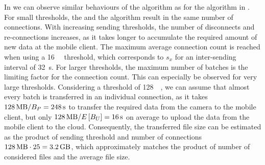 In  we can observe similar behaviours of the \algosize algorithm as for the \algointerval algorithm in .
For small thresholds, the \algosize and the \algoimmediate algorithm result in the same number of connections.
With increasing sending thresholds, the number of disconnects and re-connections increases, as it takes longer to accumulate the required amount of new data at the mobile client.
The maximum average connection count is reached when using a \SI{16}{\mega\byte} threshold, which corresponds to \(s_x\) for an inter-sending interval of \SI{32}{\second}.
For larger thresholds, the maximum number of batches is the limiting factor for the connection count.
This can especially be observed for very large thresholds.
Considering a threshold of \SI{128}{\mega\byte}, we can assume that almost every batch is transferred in an individual connection, as it takes \(\SI{128}{\mega\byte} / \panTransferRate = \SI{248}{\second}\) to transfer the required data from the camera to the mobile client, but only \(\SI{128}{\mega\byte} / E\left[\uploadbandwidth\right] = \SI{16}{\second}\) on average to upload the data from the mobile client to the cloud.
Consequently, the transferred file size can be estimated as the product of sending threshold and number of connections \(\SI{128}{\mega\byte} \cdot 25 = \SI{3.2}{\giga\byte}\), which approximately matches the product of number of considered files and the average file size.

